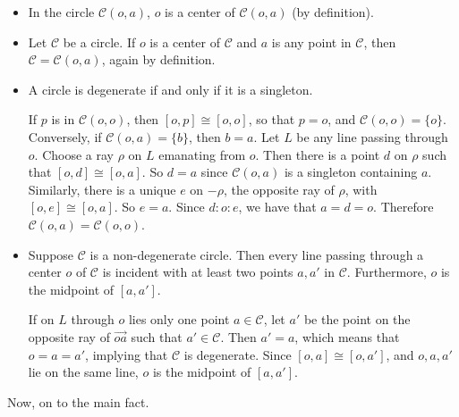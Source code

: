\documentclass[12pt]{article}
\newcommand{\ray}[1]{\overrightarrow{#1}}
\begin{document}
\begin{itemize}
\item In the circle $\mathscr{C}(o,a)$, $o$ is a center of $\mathscr{C}(o,a)$ (by definition).
\item Let $\mathscr{C}$ be a circle.  If $o$ is a center of $\mathscr{C}$ and $a$ is any point
 in $\mathscr{C}$, then $\mathscr{C}=\mathscr{C}(o,a)$, again by definition.
\item A circle is degenerate if and only if  it is a singleton.  

If $p$ is in $\mathscr{C}(o,o)$, then $[o,p]\cong [o,o]$, so that $p=o$, and 
$\mathscr{C}(o,o)=\lbrace o\rbrace$.  Conversely, if $\mathscr{C}(o,a)=\lbrace b\rbrace$, then $b=a$.  Let $L$ be any line passing through $o$.  Choose a ray $\rho$ on $L$ emanating from $o$.  Then there is a point $d$ on $\rho$ such that $[o,d]\cong [o,a]$.  So $d=a$ since $\mathscr{C}(o,a)$ is a singleton containing $a$. 
 Similarly, there is a unique $e$ on $-\rho$, the opposite ray of $\rho$, with $[o,e]\cong [o,a]$. 
 So $e=a$.  Since $d:o:e$, we have that $a=d=o$.  Therefore $\mathscr{C}(o,a)=\mathscr{C}(o,o)$.
\item Suppose $\mathscr{C}$ is a non-degenerate circle.  Then every line passing through a center $o$ of $\mathscr{C}$ is incident with at least two points $a,a'$ in $\mathscr{C}$.  Furthermore, $o$ is the midpoint of $[a,a']$.

If on $L$ through $o$ lies only one point $a \in \mathscr{C}$, let $a'$ be the point on the opposite ray of $\ray{oa}$ such that $a'\in \mathscr{C}$.  Then $a'=a$, which means that $o=a=a'$, implying that $\mathscr{C}$ is degenerate.  Since $[o,a]\cong [o,a']$, and $o,a,a'$ lie on the same line, $o$ is the midpoint of $[a,a']$.
\end{itemize}

Now, on to the main fact.
\end{document}
